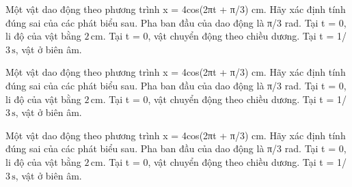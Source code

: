 \begin{ex}
Một vật dao động theo phương trình x = 4cos(2πt + π/3) cm. Hãy xác định tính đúng sai của các phát biểu sau.
\choiceTF
{\True Pha ban đầu của dao động là π/3 rad.}
{\True Tại t = 0, li độ của vật bằng $2\,\text{cm}$.}
{Tại t = 0, vật chuyển động theo chiều dương.}
{\True Tại t = 1/ $3\,\text{s}$, vật ở biên âm.}
\end{ex}

\begin{ex}
Một vật dao động theo phương trình x = 4cos(2πt + π/3) cm. Hãy xác định tính đúng sai của các phát biểu sau.
\choiceTF
{\True Pha ban đầu của dao động là π/3 rad.}
{\True Tại t = 0, li độ của vật bằng $2\,\text{cm}$.}
{Tại t = 0, vật chuyển động theo chiều dương.}
{\True Tại t = 1/ $3\,\text{s}$, vật ở biên âm.}
\end{ex}

\begin{ex}
Một vật dao động theo phương trình x = 4cos(2πt + π/3) cm. Hãy xác định tính đúng sai của các phát biểu sau.
\choiceTF
{\True Pha ban đầu của dao động là π/3 rad.}
{\True Tại t = 0, li độ của vật bằng $2\,\text{cm}$.}
{Tại t = 0, vật chuyển động theo chiều dương.}
{\True Tại t = 1/ $3\,\text{s}$, vật ở biên âm.}
\end{ex}

